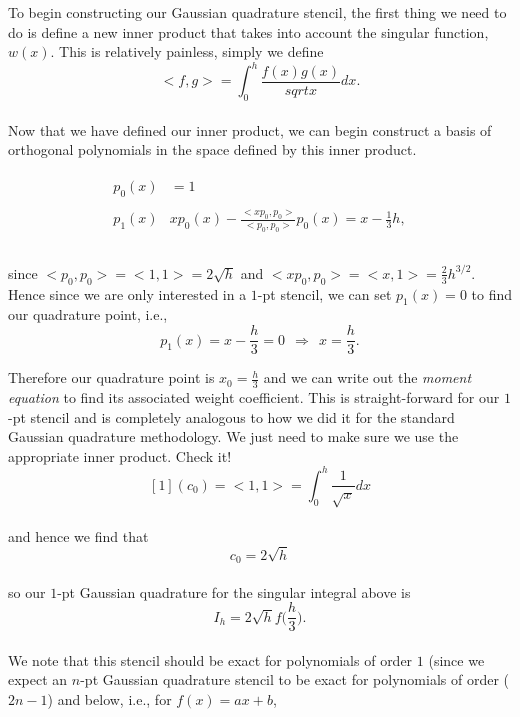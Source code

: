 \documentclass[paper=a4, fontsize=11pt]{scrartcl} %
\numberwithin{equation}{section} %
\numberwithin{figure}{section} %
\numberwithin{table}{section} %
\begin{document}
 To begin constructing our Gaussian quadrature stencil, the first thing we need to do is define a new inner product that takes into account the singular function, $w(x)$. This is relatively painless, simply we define\\ $$<f,g> = \int_0^h \frac{f(x)g(x)}{sqrt{x}} dx.$$\\
 
 Now that we have defined our inner product, we can begin construct a basis of orthogonal polynomials in the space defined by this inner product. 
 
 \begin{align}
 \nonumber
 \begin{split}
 p_0(x) &= 1 \\ \\
 p_1(x) & xp_0(x) - \frac{<xp_0,p_0> }{ <p_0,p_0> } p_0(x) = x - \frac{1}{3} h, \\ \\
 \end{split}
 \end{align}
 
 since $<p_0,p_0> = <1,1> = 2\sqrt{h}$ and $<xp_0,p_0> = <x,1> = \frac{2}{3}h^{3/2}.$ Hence since we are only interested in a $1$-pt stencil, we can set $p_1(x)=0$ to find our quadrature point, i.e., \\
 
 $$p_1(x)=x-\frac{h}{3} = 0\ \  \Rightarrow \ \ x = \frac{h}{3}.$$
 
 Therefore our quadrature point is $x_0 = \frac{h}{3}$ and we can write out the \emph{moment equation} to find its associated weight coefficient. This is straight-forward for our $1$-pt stencil and is completely analogous to how we did it for the standard Gaussian quadrature methodology. We just need to make sure we use the appropriate inner product. Check it! \\
 
 $$[1](c_0) = <1,1> = \int_0^h \frac{1}{\sqrt{x}} dx$$\\
 
 and hence we find that \\$$c_0 = 2\sqrt{h}$$\\
 
 so our $1$-pt Gaussian quadrature for the singular integral above is\\
 
 $$I_h = 2\sqrt{h} f\bigg(\frac{h}{3}\bigg).$$\\
 
 We note that this stencil should be exact for polynomials of order $1$ (since we expect an $n$-pt Gaussian quadrature stencil to be exact for polynomials of order ($2n-1$) and below, i.e., for $f(x)=ax+b$,\\
 
\end{document}
